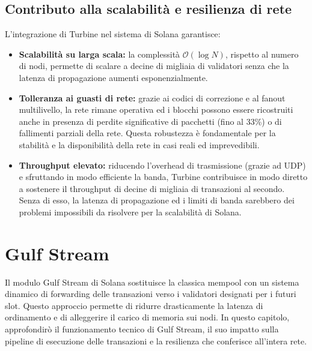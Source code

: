 \documentclass[a4paper,12pt]{report}
\begin{document}
	\subsection{Contributo alla scalabilità e resilienza di rete}
	L’integrazione di Turbine nel sistema di Solana garantisce:  
	\begin{itemize}
		\item \textbf{Scalabilità su larga scala:} la complessità \(\mathcal{O}(\log N)\), rispetto al numero di nodi, permette di scalare a decine di migliaia di validatori senza che la latenza di propagazione aumenti esponenzialmente.
		\item \textbf{Tolleranza ai guasti di rete:} grazie ai codici di correzione e al fanout multilivello, la rete rimane operativa ed i blocchi possono essere ricostruiti anche in presenza di perdite significative di pacchetti (fino al 33\%) o di fallimenti parziali della rete. Questa robustezza è fondamentale per la stabilità e la disponibilità della rete in casi reali ed imprevedibili.
		\item \textbf{Throughput elevato:} riducendo l'overhead di trasmissione (grazie ad UDP) e sfruttando in modo efficiente la banda, Turbine contribuisce in modo diretto a sostenere il throughput di decine di migliaia di transazioni al secondo. Senza di esso, la latenza di propagazione ed i limiti di banda sarebbero dei problemi impossibili da risolvere per la scalabilità di Solana.
	\end{itemize}
	
	\section{Gulf Stream}
	
	Il modulo Gulf Stream di Solana sostituisce la classica mempool con un sistema dinamico di forwarding delle transazioni verso i validatori designati per i futuri slot. Questo approccio permette di ridurre drasticamente la latenza di ordinamento e di alleggerire il carico di memoria sui nodi. In questo capitolo, approfondirò il funzionamento tecnico di Gulf Stream, il suo impatto sulla pipeline di esecuzione delle transazioni e la resilienza che conferisce all'intera rete.
	
\end{document}
